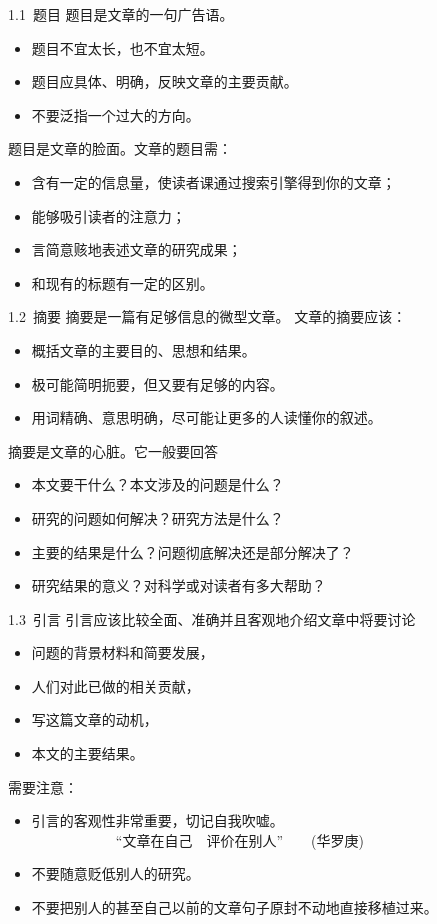 \documentclass[13pt,fontset=mac]{ctexbeamer}
\begin{document}
\begin{frame}{1.1~题目}
	题目是文章的一句广告语。
	\begin{itemize}
		\item 题目不宜太长，也不宜太短。
		\item 题目应具体、明确，反映文章的主要贡献。
		\item 不要泛指一个过大的方向。
	\end{itemize}

题目是文章的脸面。文章的题目需：
\begin{itemize}
	\item 含有一定的信息量，使读者课通过搜索引擎得到你的文章；
	\item 能够吸引读者的注意力；
	\item  言简意赅地表述文章的研究成果；
	\item 和现有的标题有一定的区别。
\end{itemize}
\end{frame}


\begin{frame}{1.2~摘要}
摘要是一篇有足够信息的微型文章。	文章的摘要应该：
	\begin{itemize}
		\item 概括文章的主要目的、思想和结果。
		\item 极可能简明扼要，但又要有足够的内容。
		\item 用词精确、意思明确，尽可能让更多的人读懂你的叙述。
	\end{itemize}
	
摘要是文章的心脏。它一般要回答
	\begin{itemize}
		\item 本文要干什么？本文涉及的问题是什么？
		\item 研究的问题如何解决？研究方法是什么？
		\item 主要的结果是什么？问题彻底解决还是部分解决了？
		\item 研究结果的意义？对科学或对读者有多大帮助？
	\end{itemize}

\end{frame}


\begin{frame}{1.3~引言}
	引言应该比较全面、准确并且客观地介绍文章中将要讨论
	\begin{itemize}
		\item 问题的背景材料和简要发展，
		\item 人们对此已做的相关贡献，
		\item 写这篇文章的动机，
		\item 本文的主要结果。
	\end{itemize}
需要注意：
	\begin{itemize}
	\item 引言的客观性非常重要，切记自我吹嘘。\\
	~~~~~~~~~~~~``文章在自己~~评价在别人''~~~~(华罗庚)
	\item 不要随意贬低别人的研究。
	\item 不要把别人的甚至自己以前的文章句子原封不动地直接移植过来。
\end{itemize}
\end{frame}
\end{document}

